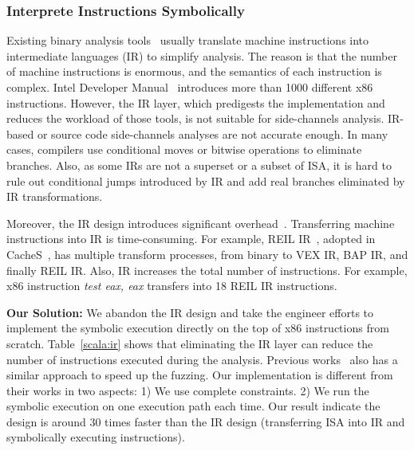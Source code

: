 \subsubsection{Interprete Instructions Symbolically}
Existing binary analysis tools~\cite{shoshitaishvili2016state,
10.1007/978-3-642-22110-1_37} usually translate machine instructions into
intermediate languages (IR) to simplify analysis. 
The reason is that the number of machine instructions is
enormous, and the semantics of each instruction is complex. Intel Developer
Manual~\cite{intelsys} introduces more than 1000 different x86 instructions. 
However, the IR layer, which predigests the implementation
and reduces the workload of those tools, is not suitable for side-channels 
analysis.
IR-based or source code side-channels analyses are not accurate enough.
In many cases, compilers use conditional moves or bitwise operations to eliminate
branches. Also, as some IRs are not a superset or a subset of ISA, 
it is hard to rule out conditional jumps introduced by IR and add real branches 
eliminated by IR transformations.

Moreover, the IR design introduces significant overhead~\cite{217563}.
Transferring machine instructions into IR is time-consuming. For example,
REIL IR~\cite{dullien2009reil}, adopted in CacheS~\cite{236338}, has multiple
transform processes, from binary to VEX IR, BAP IR, and finally REIL IR\@. 
Also, IR increases the total number of instructions. For example, x86
instruction \textit{test eax, eax} transfers into 18 REIL IR instructions. 

\textbf{Our Solution:}
We abandon the IR design and take the engineer efforts to implement 
the symbolic execution directly on the top of x86 instructions from scratch. 
Table~\ref{scala:ir} shows that eliminating the IR layer can reduce the number 
of instructions executed during the analysis. Previous works~\cite{217563} also 
has a similar approach to speed up the fuzzing. Our implementation is different
from their works in two aspects: 1) We use complete constraints. 2) We run the
symbolic execution on one execution path each time. Our result indicate the 
design is around 30 times faster than the IR design (transferring ISA into IR and
symbolically executing instructions).

